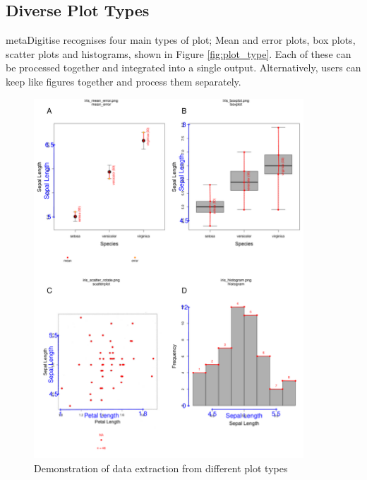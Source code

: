\documentclass{article}
\begin{document}
\subsection{Diverse Plot Types}
metaDigitise recognises four main types of plot; Mean and error plots, box plots, scatter plots and histograms, shown in Figure \ref{fig:plot_type}. Each of these can be processed together and integrated into a single output. Alternatively, users can keep like figures together and process them separately.



\begin{figure}[!h] 
 \includegraphics[width=0.9\textwidth]{fig_all_extract.pdf} 
 \caption{Demonstration of data extraction from different plot types}
\label{fig:all_extract}
\end{figure}
\end{document}
